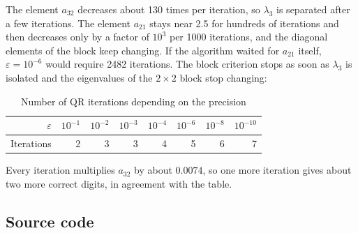 The element $a_{32}$ decreases about 130 times per iteration, so $\lambda_3$ is separated after a
few iterations. The element $a_{21}$ stays near 2.5 for hundreds of iterations and then decreases
only by a factor of $10^3$ per 1000 iterations, and the diagonal elements of the block keep
changing. If the algorithm waited for $a_{21}$ itself, $\varepsilon = 10^{-6}$ would require 2482
iterations. The block criterion stops as soon as $\lambda_3$ is isolated and the eigenvalues of
the $2 \times 2$ block stop changing:

\begin{table}[!ht]
\centering
\begin{tabular}{|r|r|r|r|r|r|r|r|}
\hline
\rowcolor{lightgray}
$\varepsilon$ & $10^{-1}$ & $10^{-2}$ & $10^{-3}$ & $10^{-4}$ & $10^{-6}$ & $10^{-8}$ &
$10^{-10}$ \\
\hline
Iterations & 2 & 3 & 3 & 4 & 5 & 6 & 7 \\
\hline
\end{tabular}
\caption{Number of QR iterations depending on the precision}
\end{table}

Every iteration multiplies $a_{32}$ by about $0.0074$, so one more iteration gives about two
more correct digits, in agreement with the table.

\subsection{Source code}




\pagebreak
